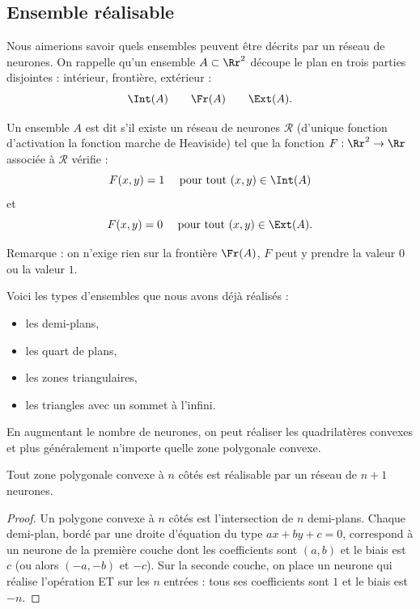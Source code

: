 \subsection{Ensemble réalisable}

Nous aimerions savoir quels ensembles peuvent être décrits par un réseau de neurones.
On rappelle qu'un ensemble $A \subset \Rr^2$ découpe le plan en trois parties disjointes : intérieur, frontière, extérieur :
$$\Int(A) \qquad \Fr(A) \qquad \Ext(A).$$


\begin{definition}{}{}
	Un ensemble $A$ est dit   s'il existe un réseau de neurones $\mathcal{R}$ (d'unique fonction d'activation la fonction marche de Heaviside) tel que
	la fonction $F : \Rr^2 \to \Rr$ associée à $\mathcal{R}$ vérifie :
	$$F(x,y) = 1 \quad \text{ pour tout } (x,y) \in \Int(A)$$
	et
	$$F(x,y) = 0 \quad \text{ pour tout } (x,y) \in \Ext(A).$$
\end{definition}



Remarque : on n'exige rien sur la frontière $\Fr(A)$, $F$ peut y prendre la valeur $0$ ou la valeur $1$.


Voici les types d'ensembles que nous avons déjà réalisés :
\begin{itemize}
	\item les demi-plans,
	\item les \og{}quart de plans\fg{},
	\item les zones triangulaires,
	\item les triangles avec un sommet \og{}à l'infini\fg{}.
\end{itemize}



En augmentant le nombre de neurones, on peut réaliser les quadrilatères convexes et plus généralement n'importe quelle zone polygonale convexe.

\begin{proposition}{}{}
	Tout zone polygonale convexe à $n$ côtés est réalisable par un réseau de $n+1$ neurones.
\end{proposition}


\begin{proof}
	Un polygone convexe à $n$ côtés est l'intersection de $n$ demi-plans.
	Chaque demi-plan, bordé par une droite d'équation du type $ax+by+c=0$, correspond à un neurone de la première couche dont les coefficients sont $(a,b)$ et le biais est $c$ (ou alors $(-a,-b)$ et $-c$).
	Sur la seconde couche, on place un neurone qui réalise l'opération \og{}ET\fg{} sur les $n$ entrées : tous ses coefficients sont $1$ et le biais est $-n$.
\end{proof}

